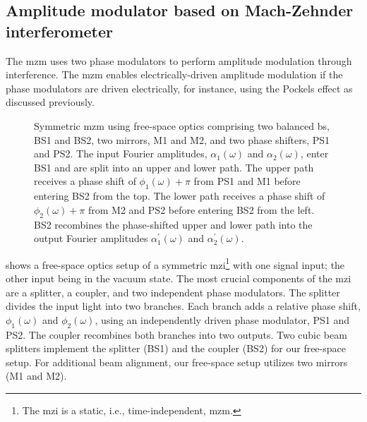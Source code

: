 \subsection{Amplitude modulator based on Mach-Zehnder interferometer}

The \gls{mzm} uses two phase modulators to perform amplitude modulation through interference.
The \gls{mzm} enables electrically-driven amplitude modulation if the phase modulators are driven electrically, for instance, using the Pockels effect as discussed previously.
\begin{figure}[htb]
	\centering
	
	\caption{Symmetric \gls{mzm} using free-space optics comprising two balanced \gls{bs}, BS1 and BS2, two mirrors, M1 and M2, and two phase shifters, PS1 and PS2. The input Fourier amplitudes, $\alpha_1(\omega)$ and $\alpha_2(\omega)$, enter BS1 and are split into an upper and lower path. The upper path receives a phase shift of $\phi_1(\omega)+\pi$ from PS1 and M1 before entering BS2 from the top. The lower path receives a phase shift of $\phi_2(\omega)+\pi$ from M2 and PS2 before entering BS2 from the left. BS2 recombines the phase-shifted upper and lower path into the output Fourier amplitudes $\alpha_1^\prime(\omega)$ and $\alpha_2^\prime(\omega)$.}\label{fig:mzi_symmetric}
\end{figure}
 shows a free-space optics setup of a symmetric \gls{mzi}\footnote{The \gls{mzi} is a static, i.e., time-independent, \gls{mzm}.} with one signal input; the other input being in the vacuum state.
The most crucial components of the \gls{mzi} are a splitter, a coupler, and two independent phase modulators.
The splitter divides the input light into two branches.
Each branch adds a relative phase shift, $\phi_1(\omega)$ and $\phi_2(\omega)$, using an independently  driven phase modulator, PS1 and PS2.
The coupler recombines both branches into two outputs.
Two cubic beam splitters implement the splitter (BS1) and the coupler (BS2) for our free-space setup.
For additional beam alignment, our free-space setup utilizes two mirrors (M1 and M2).

